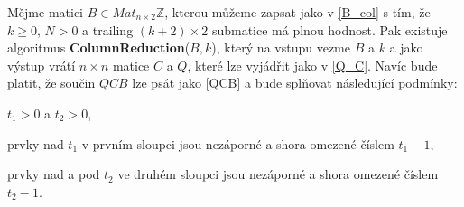 \begin{vet} \label{col_red}
Mějme matici $ B \in Mat_{n \times 2}\mathbb{Z} $, kterou můžeme zapsat jako v
\ref{B_col} s tím, že $ k \geq 0$, $ N > 0 $ a trailing $ (k+2) \times 2 $
submatice má plnou hodnost. Pak existuje algoritmus \textbf{ColumnReduction}($B, k$),
který na vstupu vezme $ B $ a $ k $ a jako výstup vrátí $ n \times n $
matice $ C $ a $ Q $, které lze vyjádřit jako v \ref{Q_C}. Navíc bude platit, že
součin $ QCB $ lze psát jako \ref{QCB} a bude splňovat následující podmínky:

\begin{Cond}
    \item $ t_1 > 0 $ a $ t_2 > 0 $,
    \item prvky nad $ t_1 $ v prvním sloupci jsou nezáporné a shora omezené číslem
    $ t_1 - 1 $,
    \item prvky nad a pod $ t_2 $ ve druhém sloupci jsou nezáporné a shora omezené
    číslem $ t_2 - 1 $.
\end{Cond}

\end{vet}
